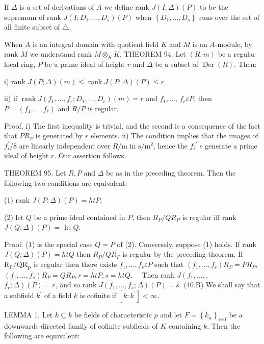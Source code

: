 If $\Delta$ is a set of derivations of $A$ we define rank $J(I ; \Delta)(P)$ to be the supremum of rank $J\left(I ; D_{1}, \ldots, D_{s}\right)(P)$ when $\left\{D_{1}, \ldots, D_{s}\right\}$ runs over the set of all finite subset of $\triangle$.

When $A$ is an integral domain with quotient field $K$ and $M$ is an $A$-module, by rank $M$ we understand rank $M \otimes_{K} K$. THEOREM 94. Let $(R, m)$ be a regular local ring, $P$ be a prime ideal of height $r$ and $\Delta$ be a subset of $\operatorname{Der}(R)$. Then:

i) rank $J(P ; \Delta)(m) \leqslant \operatorname{rank} J(P ; \Delta)(P) \leq r$

ii) if $\operatorname{rank} J\left(f_{1}, \ldots, f_{r} ; D_{1}, \ldots, D_{r}\right)(m)=r$ and $f_{1}, \ldots$, $f_{r} \varepsilon P$, then $P=\left(f_{1}, \ldots, f_{r}\right)$ and $R / P$ is regular.

Proof, i) The first inequality is trivial, and the second is a consequence of the fact that $P R_{P}$ is generated by $r$ elements. ii) The condition implies that the images of $f_{i}^{\prime} / 8$ are linearly independent over $R / \mathrm{m}$ in $\mathrm{s} / \mathrm{m}^{2}$, hence the $f_{i}{ }^{\prime}$ s generate a prime ideal of height $r$. Our assertion follows.

THEOREM 95. Let $R, P$ and $\Delta$ be as in the preceding theorem. Then the following two conditions are equivalent:

(1) rank $J(P ; \Delta)(P)=h t P$,

(2) let $Q$ be a prime ideal contained in $P$, then $R_{P} / Q R_{P}$ is regular iff rank $J(Q ; \Delta)(P)=$ ht $Q$.

Proof. (1) is the special case $Q=P$ of (2). Conversely, suppose (1) holds. If rank $J(Q ; \Delta)(P)=h t Q$ then $R_{P} / Q R_{P}$ is regular by the preceding theorem. If $\mathrm{R}_{\mathrm{P}} / \mathrm{QR}_{\mathrm{P}}$ is regular then there exists $f_{1}, \ldots, f_{r} \varepsilon P$ such that $\left(f_{1}, \ldots, f_{r}\right) R_{P}=P R_{P}$, $\left(f_{1}, \ldots, f_{s}\right) R_{P}=Q R_{P}, r=h t P, s=h t Q . \quad$ Then rank $J\left(f_{1}, \ldots,\right.$, $\left.f_{r} ; \Delta\right)(P)=r$, and so rank $J\left(f_{1}, \ldots, f_{s} ; \Delta\right)(P)=s$. (40.B) We shall say that a subfield $k^{\prime}$ of a field $k$ is cofinite if $\left[k: k^{\prime}\right]<\infty$.

LEMMA 1. Let $k \subseteq k$ be fields of characteristic $p$ and let $F=\left\{k_{\alpha}\right\}_{\alpha \varepsilon I}$ be a downwards-directed family of cofinite subfields of $K$ containing $k$. Then the following are equivalent:

